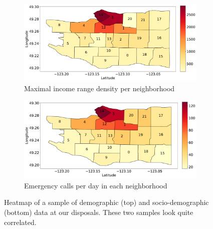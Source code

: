 \begin{figure}
    \begin{center}
        \begin{subfigure}{0.65\columnwidth}
            \includegraphics[width=\columnwidth]{figures/data_coll_char/Richness_80k+.pdf}
             \caption{Maximal income range density per neighborhood
             \vspace{0.5cm}}
            \label{fig:richness-per-zone}
        \end{subfigure}
        \begin{subfigure}{0.65\columnwidth}
            \includegraphics[width=\columnwidth]{figures/data_coll_char/emergencies.pdf}
             \caption{Emergency calls per day in each neighborhood}
            \label{fig:calls-per-zone}
        \end{subfigure}
        \caption{Heatmap of a sample of demographic (top) and socio-demographic (bottom) data at our disposals. These two samples look quite correlated.}
        \label{}
    \end{center}
\end{figure}

